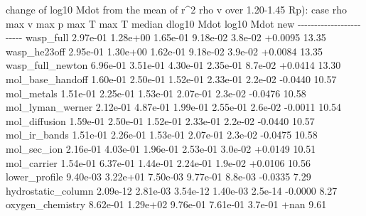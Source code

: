 \documentclass[english,a4paper]{my_memo}
\begin{document}
\begin{itemize}
  change of log10 Mdot from the mean of r\^{}2 rho v over 1.20-1.45 Rp):
  \textbar{} case \textbar{} rho max \textbar{} v max \textbar{} p max \textbar{} T max \textbar{} T median \textbar{} dlog10 Mdot \textbar{} log10 Mdot new \textbar{}
  \textbar-\/-\/-\textbar-\/-\/-\textbar-\/-\/-\textbar-\/-\/-\textbar-\/-\/-\textbar-\/-\/-\textbar-\/-\/-\textbar-\/-\/-\textbar{}
  \textbar{} wasp\_full \textbar{} 2.97e-01 \textbar{} 1.28e+00 \textbar{} 1.65e-01 \textbar{} 9.18e-02 \textbar{} 3.8e-02 \textbar{} +0.0095 \textbar{} 13.35 \textbar{}
  \textbar{} wasp\_he23off \textbar{} 2.95e-01 \textbar{} 1.30e+00 \textbar{} 1.62e-01 \textbar{} 9.18e-02 \textbar{} 3.9e-02 \textbar{} +0.0084 \textbar{} 13.35 \textbar{}
  \textbar{} wasp\_full\_newton \textbar{} 6.96e-01 \textbar{} 3.51e-01 \textbar{} 4.30e-01 \textbar{} 2.35e-01 \textbar{} 8.7e-02 \textbar{} +0.0414 \textbar{} 13.30 \textbar{}
  \textbar{} mol\_base\_handoff \textbar{} 1.60e-01 \textbar{} 2.50e-01 \textbar{} 1.52e-01 \textbar{} 2.33e-01 \textbar{} 2.2e-02 \textbar{} -0.0440 \textbar{} 10.57 \textbar{}
  \textbar{} mol\_metals \textbar{} 1.51e-01 \textbar{} 2.25e-01 \textbar{} 1.53e-01 \textbar{} 2.07e-01 \textbar{} 2.3e-02 \textbar{} -0.0476 \textbar{} 10.58 \textbar{}
  \textbar{} mol\_lyman\_werner \textbar{} 2.12e-01 \textbar{} 4.87e-01 \textbar{} 1.99e-01 \textbar{} 2.55e-01 \textbar{} 2.6e-02 \textbar{} -0.0011 \textbar{} 10.54 \textbar{}
  \textbar{} mol\_diffusion \textbar{} 1.59e-01 \textbar{} 2.50e-01 \textbar{} 1.52e-01 \textbar{} 2.33e-01 \textbar{} 2.2e-02 \textbar{} -0.0440 \textbar{} 10.57 \textbar{}
  \textbar{} mol\_ir\_bands \textbar{} 1.51e-01 \textbar{} 2.26e-01 \textbar{} 1.53e-01 \textbar{} 2.07e-01 \textbar{} 2.3e-02 \textbar{} -0.0475 \textbar{} 10.58 \textbar{}
  \textbar{} mol\_sec\_ion \textbar{} 2.16e-01 \textbar{} 4.03e-01 \textbar{} 1.96e-01 \textbar{} 2.53e-01 \textbar{} 3.0e-02 \textbar{} +0.0149 \textbar{} 10.51 \textbar{}
  \textbar{} mol\_carrier \textbar{} 1.54e-01 \textbar{} 6.37e-01 \textbar{} 1.44e-01 \textbar{} 2.24e-01 \textbar{} 1.9e-02 \textbar{} +0.0106 \textbar{} 10.56 \textbar{}
  \textbar{} lower\_profile \textbar{} 9.40e-03 \textbar{} 3.22e+01 \textbar{} 7.50e-03 \textbar{} 9.77e-01 \textbar{} 8.8e-03 \textbar{} -0.0335 \textbar{} 7.29 \textbar{}
  \textbar{} hydrostatic\_column \textbar{} 2.09e-12 \textbar{} 2.81e-03 \textbar{} 3.54e-12 \textbar{} 1.40e-03 \textbar{} 2.5e-14 \textbar{} -0.0000 \textbar{} 8.27 \textbar{}
  \textbar{} oxygen\_chemistry \textbar{} 8.62e-01 \textbar{} 1.29e+02 \textbar{} 9.76e-01 \textbar{} 7.61e-01 \textbar{} 3.7e-01 \textbar{} +nan \textbar{} 9.61 \textbar{}

\end{itemize}
\end{document}
